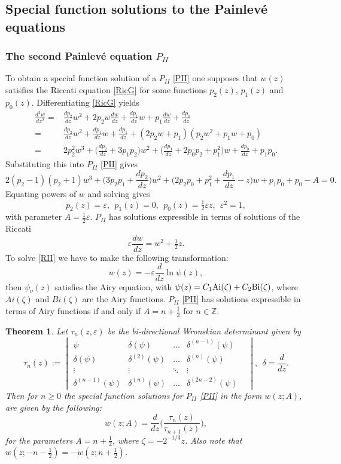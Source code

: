 \documentclass[12pt]{article}
\def\P{Painlev\'e }
\def\Z{\mathbb{Z}}
\newtheorem{mydef}{Theorem}[section]
\numberwithin{figure}{section}
\numberwithin{equation}{section}
\numberwithin{table}{section}
\begin{document}
\subsection{Special function solutions to the \P equations}
\subsubsection{The second \P equation  $P_{II}$}
To obtain a special function solution of a $P_{II}$ \eqref{PII} one supposes
that $w(z)$ satisfies the Riccati equation \eqref{RicG} for some functions $p_2(z)$, $p_1(z)$
and $p_0(z)$. Differentiating \eqref{RicG} yields
\begin{align}\nonumber
\frac{d^2w}{dz^2}=&\frac{dp_2}{dz}w^2+2p_2w\frac{dw}{dz}+\frac{dp_1}{dz}w+p_1\frac{dw}{dz}+\frac{dp_0}{dz}\\\nonumber
=&\frac{dp_2}{dz}w^2+\frac{dp_1}{dz}w+\frac{dp_1}{dz}+(2p_2w+p_1)(p_2w^2+p_1w+p_0)\\\label{RicDiff}
=&2p_2^2w^3+\bigg(\frac{dp_2}{dz}+3p_1p_2\bigg)w^2+\bigg(\frac{dp_1}{dz}+2p_0p_2+p_1^2\bigg)w+\frac{dp_0}{dz}+p_1p_0.
\end{align}
Substituting this into $P_{II}$ \eqref{PII} gives
\begin{equation}\nonumber
2(p_2-1)(p_2+1)w^3+\bigg(3p_2p_1+\frac{dp_2}{dz}\bigg)w^2+\bigg(2p_2p_0+p_1^2+\frac{dp_1}{dz}-z\bigg)w+p_1p_0+p_0-A=0.
\end{equation}
Equating powers of $w$ and solving gives
$$p_2(z)=\varepsilon,~~p_1(z)=0,~~p_0(z)=\tfrac{1}{2}\varepsilon z,~~\varepsilon^2=1,$$
with parameter $A=\tfrac{1}{2}\varepsilon$. $P_{II}$ has solutions expressible in terms of solutions of the Riccati
\begin{equation}
\varepsilon \frac{dw}{dz}=w^2+\tfrac{1}{2}z.\label{RII}
\end{equation}
To solve \eqref{RII} we have to make the following transformation:
$$w(z)=-\varepsilon\frac{d}{dz}\ln\psi(z),$$
then $\psi_\nu(z)$ satisfies the Airy equation,
with $\psi(z)=C_1{\rm{Ai}}(\zeta)+C_2{\rm{Bi}}(\zeta)$, where $Ai(\zeta)$ and $Bi(\zeta)$ are the Airy functions.
$P_{II}$ \eqref{PII} has solutions expressible in terms of Airy functions if and only if $A=n+\tfrac{1}{2}$ for $n\in\Z$.
\begin{mydef}
Let $\tau_{n}(z,\varepsilon)$ be the bi-directional Wronskian determinant given by
\[
\tau_{n}(z):=
\!\begin{vmatrix}
\psi & \delta(\psi) &\hdots& \delta^{(n-1)}(\psi) \\
\delta(\psi) & \delta^{(2)}(\psi) &\hdots& \delta^{(n)}(\psi)  \\
\vdots &\vdots & \ddots & \vdots & \\
\delta^{(n-1)}(\psi) & \delta^{(n)}(\psi) &\hdots& \delta^{(2n-2)}(\psi)
\end{vmatrix},~~\delta=\frac{d}{dz}.
\]
Then for $n\geq0$ the special function solutions for $P_{II}$ \eqref{PII} in the form $w(z;A)$, are given by the following:
$$w(z;A)=\frac{d}{dz}\bigg(\frac{\tau_n(z)}{\tau_{n+1}(z)}\bigg),$$
for the parameters $A=n+\tfrac{1}{2}$,
where $\zeta=-2^{-1/3}z$. Also note that $w(z;-n-\tfrac{1}{2})=-w(z;n+\tfrac{1}{2})$.
\end{mydef}
\end{document}
